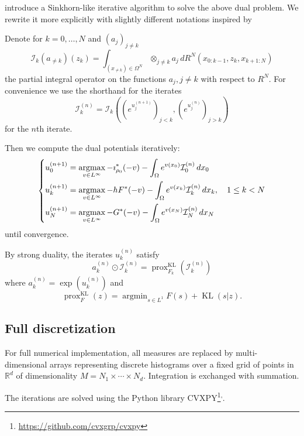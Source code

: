 \documentclass{article}
\newcommand{\RR}{\mathbb{R}}
\newcommand{\calI}{\mathcal{I}}
\DeclareMathOperator*{\argmin}{argmin}
\DeclareMathOperator*{\argmax}{argmax}
\DeclareMathOperator{\KL}{KL}
\DeclareMathOperator{\prox}{prox}
\begin{document}
    \textcite{benamou2018entropy} introduce a Sinkhorn-like iterative algorithm to solve the above dual problem. We rewrite it more explicitly with slightly different notations inspired by \cite{chizat2016scaling}
    \begin{thmalgo}
   	Denote for $k=0,\ldots,N$ and $(a_j)_{j\neq k}$
   	\[
   		\calI_k(a_{\neq k})(z_k) = 
   		\int_{(x_{\neq k}) \in\Omega^N} \otimes_{j\neq k} a_j\,
   		dR^N(x_{0:k-1}, z_k, x_{k+1:N})
   	\]
   	the partial integral operator on the functions $a_j,j\neq k$ with respect to $R^N$.
   	For convenience we use the shorthand for the iterates
   	\[
   		\calI_k^{(n)} = \calI_k\left(\left(e^{u^{(n+1)}_j}\right)_{j<k}, \left(e^{u^{(n)}_j}\right)_{j>k}\right)
   	\]
   	for the $n$th iterate.
   	
   	Then we compute the dual potentials iteratively:
   	\begin{equation}
	   	\begin{dcases}
	   	u_0^{(n+1)} = \argmax_{v \in L^\infty} -\imath_{\rho_0}^*(-v) - \int_{\Omega} e^{v(x_0)} \calI_0^{(n)} \,dx_0 \\
	   	u_k^{(n+1)} = \argmax_{v \in L^\infty} -hF^*(-v) - \int_{\Omega} e^{v(x_k)} \calI_k^{(n)} \,dx_k,\quad 1\leq k < N \\
	   	u_N^{(n+1)} = \argmax_{v \in L^\infty} -G^*(-v) - \int_{\Omega} e^{v(x_N)} \calI_N^{(n)} \,dx_N
	   	\end{dcases}
   	\end{equation}
  	until convergence.
	
	By strong duality, the iterates $u_k^{(n)}$ satisfy
	\[
		a_k^{(n)}\odot \calI_k^{(n)} =
		\prox_{F_k}^{\KL}(\calI_k^{(n)})
	\]
	where $a^{(n)}_k = \exp(u^{(n)}_k)$ and
	\[
		\prox_F^{\KL}(z) = \argmin_{s\in L^1} F(s) + \KL(s|z).
	\]
	\end{thmalgo}
    
    
    
    
    
    \subsection{Full discretization}
    
    For full numerical implementation, all measures are replaced by multi-dimensional arrays representing discrete histograms over a fixed grid of points in $\RR^d$ of dimensionality $M = N_1\times\cdots\times N_d$. Integration is exchanged with summation.
    
    The iterations are solved using the Python library CVXPY\footnote{\url{https://github.com/cvxgrp/cvxpy}}\textsuperscript{,}.
    
\end{document}
